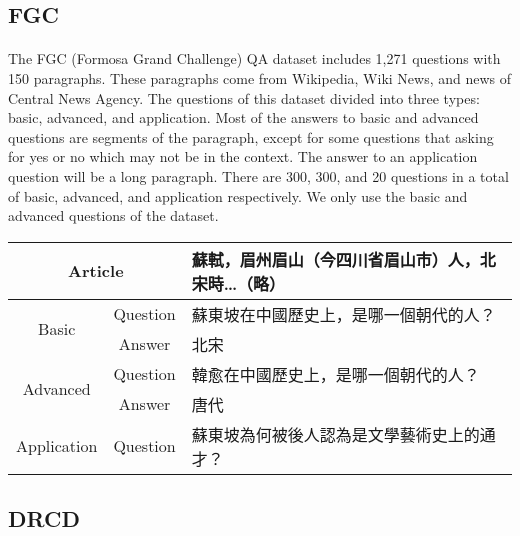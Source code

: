 \documentclass{article}
\begin{document}
\subsection{FGC}
\paragraph{}
The FGC (Formosa Grand Challenge) QA dataset includes 1,271 questions with 150 paragraphs. These paragraphs come from Wikipedia, Wiki News, and news of Central News Agency. The questions of this dataset divided into three types: basic, advanced, and application. Most of the answers to basic and advanced questions are segments of the paragraph, except for some questions that asking for yes or no which may not be in the context. The answer to an application question will be a long paragraph. There are 300, 300, and 20 questions in a total of basic, advanced, and application respectively. We only use the basic and advanced questions of the dataset.

\begin{CJK*}{UTF8}{bsmi}
  \begin{table}[!ht]
    \centering
    \begin{tabular}{|c|c|l|}
      \hline
      \multicolumn{2}{|c|}{Article} & 蘇軾，眉州眉山（今四川省眉山市）人，北宋時…（略） \\ \hline
      \multirow{2}{*}{Basic} & Question & 蘇東坡在中國歷史上，是哪一個朝代的人？ \\ \cline{2-3}
      & Answer & 北宋 \\ \hline
      \multirow{2}{*}{Advanced} & Question & 韓愈在中國歷史上，是哪一個朝代的人？ \\ \cline{2-3}
      & Answer & 唐代 \\ \hline
      Application & Question & 蘇東坡為何被後人認為是文學藝術史上的通才？ \\ \hline
    \end{tabular}
  \end{table}
\end{CJK*}

\subsection{DRCD}
\end{document}
